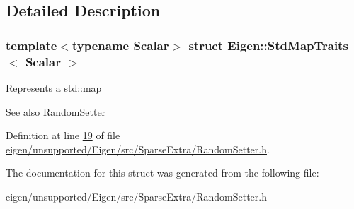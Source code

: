 \subsection{Detailed Description}
\subsubsection*{template$<$typename Scalar$>$\newline
struct Eigen\+::\+Std\+Map\+Traits$<$ Scalar $>$}

Represents a std\+::map

\begin{DoxySeeAlso}{See also}
\hyperlink{class_eigen_1_1_random_setter}{Random\+Setter} 
\end{DoxySeeAlso}


Definition at line \hyperlink{eigen_2unsupported_2_eigen_2src_2_sparse_extra_2_random_setter_8h_source_l00019}{19} of file \hyperlink{eigen_2unsupported_2_eigen_2src_2_sparse_extra_2_random_setter_8h_source}{eigen/unsupported/\+Eigen/src/\+Sparse\+Extra/\+Random\+Setter.\+h}.



The documentation for this struct was generated from the following file\+:\begin{DoxyCompactItemize}
\item 
eigen/unsupported/\+Eigen/src/\+Sparse\+Extra/\+Random\+Setter.\+h\end{DoxyCompactItemize}
